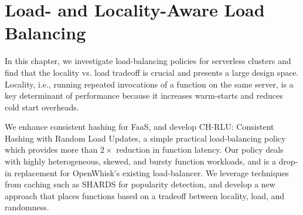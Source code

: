 \chapter{Load- and Locality-Aware Load Balancing}
\label{chap:chrlu}

In this chapter, we investigate load-balancing policies for serverless clusters and find that the locality vs. load tradeoff is crucial and presents a large design space.
Locality, i.e., running repeated invocations of a function on the same server, is a key determinant of performance because it increases warm-starts and reduces cold start overheads. 

We enhance consistent hashing for FaaS, and develop CH-RLU: Consistent Hashing with Random Load Updates, a simple practical load-balancing policy which provides more than $2\times$ reduction in function latency. 
Our policy deals with highly heterogeneous, skewed, and bursty function workloads, and is a drop-in replacement for OpenWhisk's existing load-balancer.
We leverage techniques from caching such as SHARDS for popularity detection, and develop a new approach that places functions based on a tradeoff between locality, load, and randomness. 













